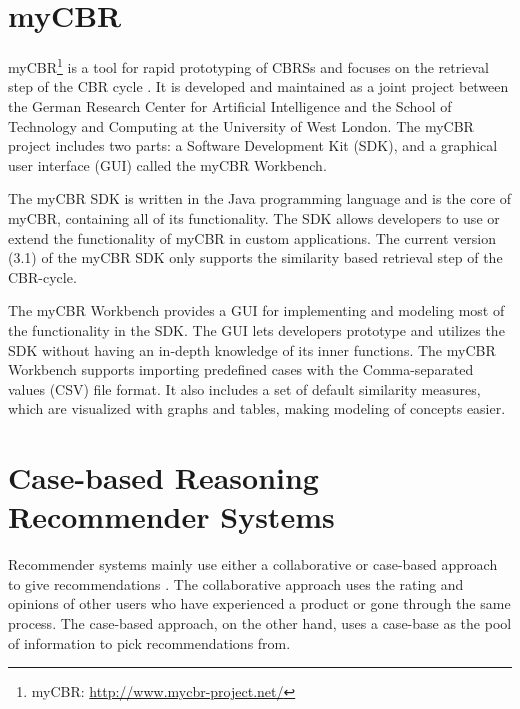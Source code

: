 \section{myCBR}

myCBR\footnote{myCBR: \url{http://www.mycbr-project.net/}} is a tool for rapid prototyping of CBRSs and focuses on the retrieval step of the CBR cycle \cite{Stahl2008}. It is developed and maintained as a joint project between the German Research Center for Artificial Intelligence and the School of Technology and Computing at the University of West London. The myCBR project includes two parts: a Software Development Kit (SDK), and a graphical user interface (GUI) called the myCBR Workbench.

The myCBR SDK is written in the Java programming language and is the core of myCBR, containing all of its functionality. The SDK allows developers to use or extend the functionality of myCBR in custom applications. The current version (3.1) of the myCBR SDK only supports the similarity based retrieval step of the CBR-cycle.

The myCBR Workbench provides a GUI for implementing and modeling most of the functionality in the SDK. The GUI lets developers prototype and utilizes the SDK without having an in-depth knowledge of its inner functions. The myCBR Workbench supports importing predefined cases with the Comma-separated values (CSV) file format. It also includes a set of default similarity measures, which are visualized with graphs and tables, making modeling of concepts easier.

\section{Case-based Reasoning Recommender Systems}\label{sec:case_based_recommender_systems}

Recommender systems mainly use either a collaborative or case-based approach to give recommendations \cite{bridge2005case}. The collaborative approach uses the rating and opinions of other users who have experienced a product or gone through the same process. The case-based approach, on the other hand, uses a case-base as the pool of information to pick recommendations from.

